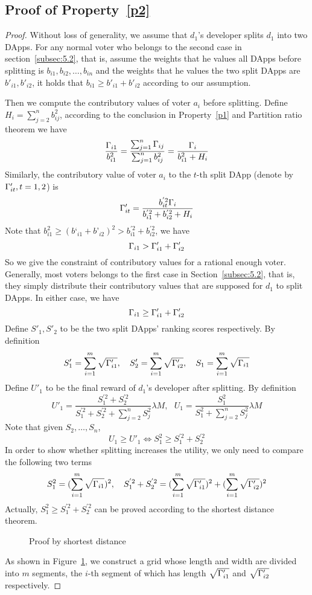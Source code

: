 \subsection{Proof of Property~\ref{p2}}
\label{subsection:proof2}
\begin{proof}
	Without loss of generality, we assume that $d_1$'s developer splits $d_1$
	into two DApps. For any normal voter who belongs to the second case in
	section~\ref{subsec:5.2}, that is, assume the weights that he values all
	DApps before splitting is $b_{i1},b_{i2},\ldots,b_{in}$ and the weights that he values the two split DApps are $b'_{i1},b'_{i2}$, it holds that $b_{i1} \geq b'_{i1}+b'_{i2}$ according to our assumption.

	Then we compute the contributory values of voter $a_i$ before splitting. Define $H_i = \sum_{j=2}^n b_{ij}^2$, according to the conclusion in Property~\ref{p1} and Partition ratio theorem we have
		 $$\frac{\Gamma_{i1}}{b_{i1}^2} = \frac{\sum_{j=1}^n \Gamma_{ij}}{\sum_{j=1}^n b_{ij}^2} = \frac{\Gamma_i}{b_{i1}^2+H_i}$$
  Similarly, the contributory value of voter $a_i$ to the $t$-th split DApp (denote by $\Gamma'_{it},t=1,2$) is
  	 $$\Gamma'_{it} =  \frac{b_{it}^{'2}\Gamma_i}{b_{i1}^{'2}+b_{i2}^{'2}+H_i}$$
  	 Note that $b_{i1}^2 \geq (b‘_{i1}+b’_{i2})^2 >b_{i1}^{'2}+b_{i2}^{'2}$, we have
  	 $$\Gamma_{i1} > \Gamma'_{i1}+\Gamma'_{i2}$$
  	 So we give the constraint of contributory values for a rational enough voter. Generally, most voters belongs to the first case in Section~\ref{subsec:5.2}, that is, they simply distribute their contributory values that are supposed for $d_1$ to split DApps. In either case, we have
  	 	 	$$\Gamma_{i1} \geq \Gamma'_{i1}+\Gamma'_{i2}$$
  	 Define $S'_1,S'_2$ to be the two split DApps' ranking scores respectively. By definition
  	 	 $$S'_1 =  \sum_{i=1}^m \sqrt{\Gamma'_{i1}},~~~S'_2 =  \sum_{i=1}^m \sqrt{\Gamma'_{i2}},~~~S_1 = \sum_{i=1}^m \sqrt{\Gamma_{i1}}$$
  	Define $U'_1$ to be the final reward of $d_1$'s developer after splitting. By definition
  		 $$U'_1=\frac{S_1^{'2}+S_2^{'2}}{S_1^{'2}+S_2^{'2}+\sum_{j=2}^n S_j^2} \lambda M,~~~U_1=\frac{S^2_1}{S_1^2+\sum_{j=2}^n S_j^2} \lambda M$$
  	Note that given $S_2,\ldots,S_n$,
  		 $$ U_1 \geq U'_1 \Leftrightarrow S_1^2 \geq S_1^{'2}+S_2^{'2}$$
   In order to show whether splitting increases the utility, we only need to compare the following two terms
   	 $$S_1^2 = (\sum_{i=1}^m \sqrt{\Gamma_{i1}})^2,~~~S_1^{'2}+S_2^{'2}=  (\sum_{i=1}^m \sqrt{\Gamma'_{i1}})^2+(\sum_{i=1}^m \sqrt{\Gamma'_{i2}})^2$$
   	Actually, $S_1^2 \geq S_1^{'2}+S_2^{'2}$ can be proved according to the shortest distance theorem.
   		 \begin{figure}
   		 	\centering
   		 	
   		 	\caption{Proof by shortest distance\label{fig:path}}
   		 \end{figure}
   As shown in Figure~\ref{fig:path}, we construct a grid whose length and width are divided into $m$ segments,  the $i$-th segment of which has length $\sqrt{\Gamma'_{i1}}$ and $\sqrt{\Gamma'_{i2}}$ respectively.


\end{proof}
